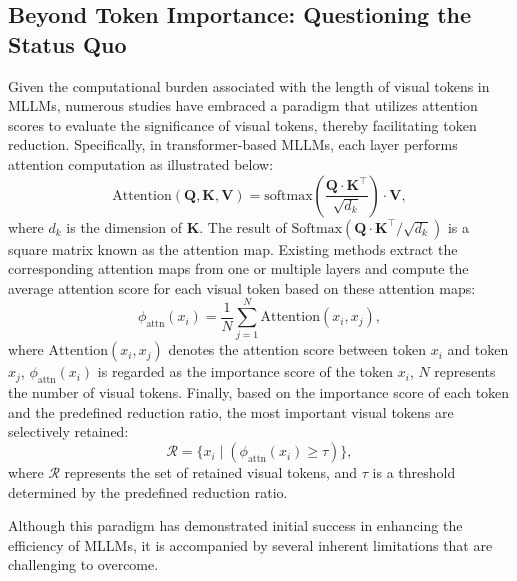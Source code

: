 \subsection{Beyond Token Importance: Questioning the Status Quo}
Given the computational burden associated with the length of visual tokens in MLLMs, numerous studies have embraced a paradigm that utilizes attention scores to evaluate the significance of visual tokens, thereby facilitating token reduction.
Specifically, in transformer-based MLLMs, each layer performs attention computation as illustrated below:
\begin{equation}
   \text{Attention}(\mathbf{Q}, \mathbf{K}, \mathbf{V}) = \text{softmax}\left(\frac{\mathbf{Q} \cdot \mathbf{K}^\top}{\sqrt{d_k}}\right)\cdot \mathbf{V},
\end{equation}
where $d_k$ is the dimension of $\mathbf{K}$. The result of $\text{Softmax}(\mathbf{Q}\cdot \mathbf{K}^\top/\sqrt{d_k})$ is a square matrix known as the attention map.
Existing methods extract the corresponding attention maps from one or multiple layers and compute the average attention score for each visual token based on these attention maps:
\begin{equation}
    \phi_{\text{attn}}(x_i) = \frac{1}{N} \sum_{j=1}^{N} \text{Attention}(x_i, x_j),
\end{equation}
where $\text{Attention}(x_i, x_j)$ denotes the attention score between token $x_i$ and token $x_j$, $\phi_{\text{attn}}(x_i)$ is regarded as the importance score of the token $x_i$, $N$ represents the number of visual tokens.
Finally, based on the importance score of each token and the predefined reduction ratio, the most important visual tokens are selectively retained:
\begin{equation}
    \mathcal{R} = \{ x_i \mid (\phi_{\text{attn}}(x_i) \geq \tau) \},
\end{equation}
where $\mathcal{R}$ represents the set of retained visual tokens, and $\tau$ is a threshold determined by the predefined reduction ratio.

 Although this paradigm has demonstrated initial success in enhancing the efficiency of MLLMs, it is accompanied by several inherent limitations that are challenging to overcome.

